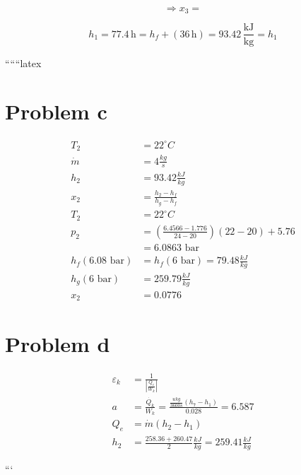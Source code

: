 \[
\Rightarrow x_3 =
\]

\[
h_1 = 77.4 \, \text{h} = h_f + (36 \, \text{h}) = 93.42 \, \frac{\text{kJ}}{\text{kg}} = h_1
\]

``````latex

\section*{Problem c}

\begin{align*}
T_2 &= 22^\circ C \\
\dot{m} &= 4 \frac{kg}{s} \\
h_2 &= 93.42 \frac{kJ}{kg} \\
x_2 &= \frac{h_2 - h_f}{h_g - h_f} \\
T_2 &= 22^\circ C \\
p_2 &= \left( \frac{6.4566 - 1.776}{24 - 20} \right) (22 - 20) + 5.76 \\
&= 6.0863 \text{ bar} \\
h_f (6.08 \text{ bar}) &= h_f (6 \text{ bar}) = 79.48 \frac{kJ}{kg} \\
h_g (6 \text{ bar}) &= 259.79 \frac{kJ}{kg} \\
x_2 &= 0.0776
\end{align*}

\section*{Problem d}

\begin{align*}
\varepsilon_k &= \frac{1}{\left| \frac{Q_{e}}{W_{k}} \right|} \\
a &= \frac{\dot{Q_k}}{W_k} = \frac{\frac{u k g}{3600 s} (h_7 - h_1)}{0.028} = 6.587 \\
Q_{e} &= \dot{m} (h_2 - h_1) \\
h_2 &= \frac{258.36 + 260.47}{2} \frac{kJ}{kg} = 259.41 \frac{kJ}{kg}
\end{align*}

```